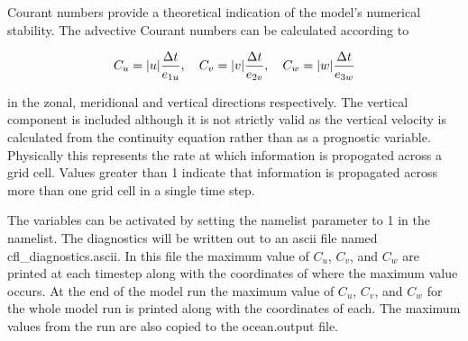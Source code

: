 \documentclass[../tex_main/NEMO_manual]{subfiles}
\begin{document}
Courant numbers provide a theoretical indication of the model's numerical stability.
The advective Courant numbers can be calculated according to

\[	C_u = |u|\frac{\Delta t}{e_{1u}}, \quad C_v = |v|\frac{\Delta t}{e_{2v}}, \quad C_w = |w|\frac{\Delta t}{e_{3w}}
 \label{eq:CFL} \]

in the zonal, meridional and vertical directions respectively.
The vertical component is included although it is not strictly valid as the vertical velocity is calculated from
the continuity equation rather than as a prognostic variable.
Physically this represents the rate at which information is propogated across a grid cell.
Values greater than 1 indicate that information is propagated across more than one grid cell in a single time step.

The variables can be activated by setting the  namelist parameter to 1 in the  namelist.
The diagnostics will be written out to an ascii file named cfl\_diagnostics.ascii.
In this file the maximum value of $C_u$, $C_v$, and $C_w$ are printed at each timestep along with the coordinates of
where the maximum value occurs.
At the end of the model run the maximum value of $C_u$, $C_v$, and $C_w$ for the whole model run is printed along
with the coordinates of each.
The maximum values from the run are also copied to the ocean.output file. 

\end{document}
